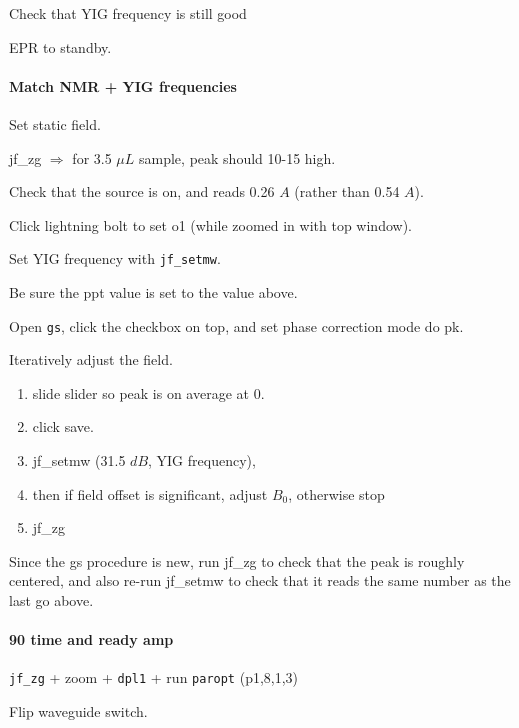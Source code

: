 \begin{scriptsize}
\begin{python}[off]
Check that YIG frequency is still good

EPR to standby.

\paragraph{ Match NMR + YIG frequencies}
Set static field.

jf\_zg $\Rightarrow$ for 3.5 $\mu L$ sample, peak should 10-15 high.

Check that the source is on, and reads 0.26 $A$ (rather than 0.54 $A$).

Click lightning bolt to set o1 (while zoomed in with top window).

Set YIG frequency with \texttt{jf\_setmw}.

Be sure the ppt value is set to the value above.

Open \texttt{gs}, click the checkbox on top, and set phase correction mode do pk. 

Iteratively adjust the field.
{\small
\begin{enumerate}
    \item slide slider so peak is on average at 0. 
    \item click save. 
	\item jf\_setmw (31.5 $dB$, YIG frequency),
	\item then if field offset is significant, adjust $B_0$, otherwise stop
	\item jf\_zg
\end{enumerate}
}

Since the gs procedure is new,
run jf\_zg to check that the peak is roughly centered,
and also re-run jf\_setmw to check that it
reads the same number as the last go above.

\paragraph{90 time and ready amp}
{\tt jf\_zg} + zoom + {\tt dpl1} + run {\tt paropt} (p1,8,1,3)

Flip waveguide switch.


\end{python}
\end{scriptsize}

